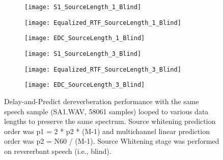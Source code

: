 \begin{figure}[H]
	\centering
	\begin{subfigure}[b]{0.3\textwidth}
		\centering
		\texttt{[image: S1\_SourceLength\_1\_Blind]}
	\end{subfigure}
	\begin{subfigure}[b]{0.3\textwidth}
		\centering
		\texttt{[image: Equalized\_RTF\_SourceLength\_1\_Blind]}
	\end{subfigure}
	\begin{subfigure}[b]{0.3\textwidth}
		\centering
		\texttt{[image: EDC\_SourceLength\_1\_Blind]}
	\end{subfigure}
	\begin{subfigure}[b]{0.3\textwidth}
		\centering
		\texttt{[image: S1\_SourceLength\_3\_Blind]}
	\end{subfigure}
	\begin{subfigure}[b]{0.3\textwidth}
		\centering
		\texttt{[image: Equalized\_RTF\_SourceLength\_3\_Blind]}
	\end{subfigure}
	\begin{subfigure}[b]{0.3\textwidth}
		\centering
		\texttt{[image: EDC\_SourceLength\_3\_Blind]}
	\end{subfigure}
	\caption{Delay-and-Predict dereverberation performance with the same speech sample (SA1.WAV, 58061 samples) looped to various data lengths to preserve the same spectrum. Source whitening prediction order was p1 = 2 * p2 * (M-1) and multichannel linear prediction order was p2 = N60 / (M-1). Source Whitening stage was performed on revererbant speech (i.e., blind).}
	\label{fig:params_source_length_compare}
\end{figure}

